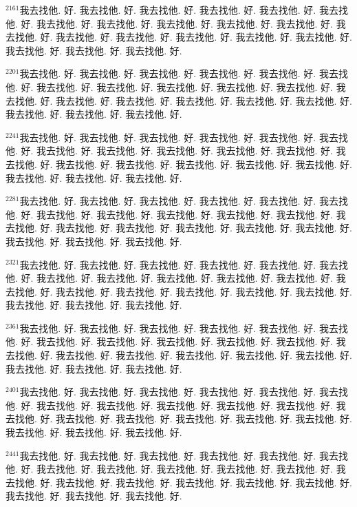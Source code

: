 \documentclass{book}
\begin{document}
$^{2161}$我去找他.
好.
我去找他.
好.
我去找他.
好.
我去找他.
好.
我去找他.
好.
我去找他.
好.
我去找他.
好.
我去找他.
好.
我去找他.
好.
我去找他.
好.
我去找他.
好.
我去找他.
好.
我去找他.
好.
我去找他.
好.
我去找他.
好.
我去找他.
好.
我去找他.
好.
我去找他.
好.
我去找他.
好.
我去找他.
好.

$^{2201}$我去找他.
好.
我去找他.
好.
我去找他.
好.
我去找他.
好.
我去找他.
好.
我去找他.
好.
我去找他.
好.
我去找他.
好.
我去找他.
好.
我去找他.
好.
我去找他.
好.
我去找他.
好.
我去找他.
好.
我去找他.
好.
我去找他.
好.
我去找他.
好.
我去找他.
好.
我去找他.
好.
我去找他.
好.
我去找他.
好.

$^{2241}$我去找他.
好.
我去找他.
好.
我去找他.
好.
我去找他.
好.
我去找他.
好.
我去找他.
好.
我去找他.
好.
我去找他.
好.
我去找他.
好.
我去找他.
好.
我去找他.
好.
我去找他.
好.
我去找他.
好.
我去找他.
好.
我去找他.
好.
我去找他.
好.
我去找他.
好.
我去找他.
好.
我去找他.
好.
我去找他.
好.

$^{2281}$我去找他.
好.
我去找他.
好.
我去找他.
好.
我去找他.
好.
我去找他.
好.
我去找他.
好.
我去找他.
好.
我去找他.
好.
我去找他.
好.
我去找他.
好.
我去找他.
好.
我去找他.
好.
我去找他.
好.
我去找他.
好.
我去找他.
好.
我去找他.
好.
我去找他.
好.
我去找他.
好.
我去找他.
好.
我去找他.
好.

$^{2321}$我去找他.
好.
我去找他.
好.
我去找他.
好.
我去找他.
好.
我去找他.
好.
我去找他.
好.
我去找他.
好.
我去找他.
好.
我去找他.
好.
我去找他.
好.
我去找他.
好.
我去找他.
好.
我去找他.
好.
我去找他.
好.
我去找他.
好.
我去找他.
好.
我去找他.
好.
我去找他.
好.
我去找他.
好.
我去找他.
好.

$^{2361}$我去找他.
好.
我去找他.
好.
我去找他.
好.
我去找他.
好.
我去找他.
好.
我去找他.
好.
我去找他.
好.
我去找他.
好.
我去找他.
好.
我去找他.
好.
我去找他.
好.
我去找他.
好.
我去找他.
好.
我去找他.
好.
我去找他.
好.
我去找他.
好.
我去找他.
好.
我去找他.
好.
我去找他.
好.
我去找他.
好.

$^{2401}$我去找他.
好.
我去找他.
好.
我去找他.
好.
我去找他.
好.
我去找他.
好.
我去找他.
好.
我去找他.
好.
我去找他.
好.
我去找他.
好.
我去找他.
好.
我去找他.
好.
我去找他.
好.
我去找他.
好.
我去找他.
好.
我去找他.
好.
我去找他.
好.
我去找他.
好.
我去找他.
好.
我去找他.
好.
我去找他.
好.

$^{2441}$我去找他.
好.
我去找他.
好.
我去找他.
好.
我去找他.
好.
我去找他.
好.
我去找他.
好.
我去找他.
好.
我去找他.
好.
我去找他.
好.
我去找他.
好.
我去找他.
好.
我去找他.
好.
我去找他.
好.
我去找他.
好.
我去找他.
好.
我去找他.
好.
我去找他.
好.
我去找他.
好.
我去找他.
好.
我去找他.
好.
\end{document}

